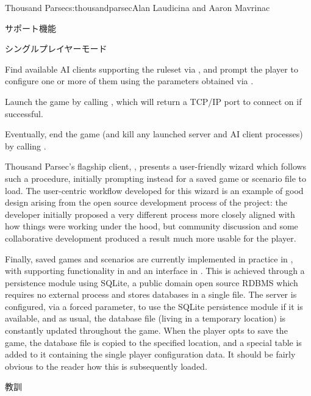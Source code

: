 \begin{aosachapter}{Thousand Parsec}{s:thousandparsec}{Alan Laudicina and Aaron Mavrinac}
\begin{aosasect1}{サポート機能}
\begin{aosasect2}{シングルプレイヤーモード}
\begin{aosaenumerate}
  \item Find available AI clients supporting the ruleset
  via , and
  prompt the player to configure one or more of them using the
  parameters obtained via .

  \item Launch the game by calling ,
  which will return a TCP/IP port to connect on if successful.

  \item Eventually, end the game (and kill any launched server and AI
  client processes) by calling .

\end{aosaenumerate}

Thousand Parsec's flagship client, , presents a
user-friendly wizard which follows such a procedure, initially
prompting instead for a saved game or scenario file to load. The
user-centric workflow developed for this wizard is an example of good
design arising from the open source development process of the
project: the developer initially proposed a very different process
more closely aligned with how things were working under the hood, but
community discussion and some collaborative development produced a
result much more usable for the player.

Finally, saved games and scenarios are currently implemented in
practice in , with supporting functionality in
 and an interface in . This
is achieved through a persistence module using SQLite, a public domain
open source RDBMS which requires no external process and stores
databases in a single file. The server is configured, via a forced
parameter, to use the SQLite persistence module if it is available,
and as usual, the database file (living in a temporary location) is
constantly updated throughout the game. When the player opts to save
the game, the database file is copied to the specified location, and a
special table is added to it containing the single player
configuration data. It should be fairly obvious to the reader how this
is subsequently loaded.

\end{aosasect2}

\end{aosasect1}

\begin{aosasect1}{教訓}


\end{aosasect1}
\end{aosachapter}

